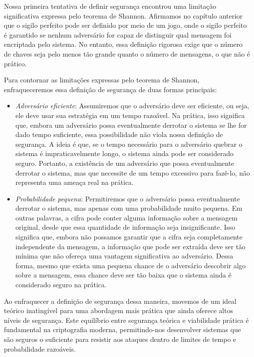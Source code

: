 Nossa primeira tentativa de definir segurança encontrou uma limitação significativa expressa pelo teorema de Shannon.
Afirmamos no capítulo anterior que o sigilo perfeito pode ser definido por meio de um jogo, onde o sigilo perfeito é garantido se nenhum adversário for capaz de distinguir qual mensagem foi encriptada pelo sistema.
No entanto, essa definição rigorosa exige que o número de chaves seja pelo menos tão grande quanto o número de mensagens, o que não é prático.

Para contornar as limitações expressas pelo teorema de Shannon, enfraqueceremos essa definição de segurança de duas formas principais:
\begin{itemize}
\item {\em Adversário eficiente}:
  Assumiremos que o adversário deve ser eficiente, ou seja, ele deve usar sua estratégia em um tempo razoável.
  Na prática, isso significa que, embora um adversário possa eventualmente derrotar o sistema se lhe for dado tempo suficiente, essa possibilidade não viola nossa definição de segurança.
  A ideia é que, se o tempo necessário para o adversário quebrar o sistema é impraticavelmente longo, o sistema ainda pode ser considerado seguro.
  Portanto, a existência de um adversário que possa eventualmente derrotar o sistema, mas que necessite de um tempo excessivo para fazê-lo, não representa uma ameaça real na prática.
\item {\em Probabilidade pequena}:
  Permitiremos que o adversário possa eventualmente derrotar o sistema, mas apenas com uma probabilidade muito pequena.
  Em outras palavras, a cifra pode conter alguma informação sobre a mensagem original, desde que essa quantidade de informação seja insignificante.
  Isso significa que, embora não possamos garantir que a cifra seja completamente independente da mensagem, a informação que pode ser extraída deve ser tão mínima que não ofereça uma vantagem significativa ao adversário.
  Dessa forma, mesmo que exista uma pequena chance de o adversário descobrir algo sobre a mensagem, essa chance deve ser tão baixa que o sistema ainda é considerado seguro na prática.
\end{itemize}

Ao enfraquecer a definição de segurança dessa maneira, movemos de um ideal teórico inatingível para uma abordagem mais prática que ainda oferece altos níveis de segurança.
Este equilíbrio entre segurança teórica e viabilidade prática é fundamental na criptografia moderna, permitindo-nos desenvolver sistemas que são seguros o suficiente para resistir aos ataques dentro de limites de tempo e probabilidade razoáveis.

